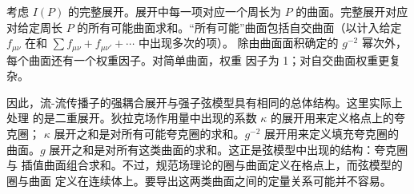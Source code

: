 考虑 $I(P)$ 的完整展开。展开中每一项对应一个周长为 $P$ 的曲面。完整展开对应
对给定周长 $P$ 的所有可能曲面求和。``所有可能''曲面包括自交曲面（以计入给定
$f_{\mu\nu}$ 在和 $\sum f_{\mu\nu} + f_{\mu\nu'} + \cdots$ 中出现多次的项）。
除由曲面面积确定的 $g^{-2}$ 幂次外，每个曲面还有一个权重因子。对简单曲面，权重
因子为 1；对自交曲面权重更复杂。

因此，流-流传播子的强耦合展开与强子弦模型具有相同的总体结构。这里实际上处理
的是二重展开。狄拉克场作用量中出现的系数 $\kappa$ 的展开用来定义格点上的夸克圈；
$\kappa$ 展开之和是对所有可能夸克圈的求和。$g^{-2}$ 展开用来定义填充夸克圈的
曲面。$g$ 展开之和是对所有这类曲面的求和。这正是弦模型中出现的结构：夸克圈与
插值曲面组合求和。不过，规范场理论的圈与曲面定义在格点上，而弦模型的圈与曲面
定义在连续体上。要导出这两类曲面之间的定量关系可能并不容易。
